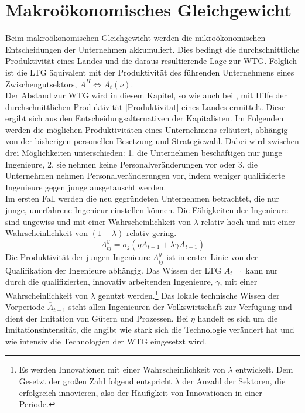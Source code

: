 \section[Makroökonomisches Gleichgewicht]{Makroökonomisches Gleichgewicht}\label{sec:makro GG}
Beim makroökonomischen Gleichgewicht werden die mikroökonomischen Entscheidungen der Unternehmen akkumuliert. Dies bedingt die durchschnittliche Produktivität eines Landes und die daraus resultierende Lage zur WTG. Folglich ist die LTG äquivalent mit der Produktivität des führenden Unternehmens eines Zwischengutsektors, $A^H \Leftrightarrow A_t(\nu)$.\\
%
Der Abstand zur WTG wird in diesem Kapitel, so wie auch bei \cite{Acemoglu.2006}, mit Hilfe der durchschnittlichen Produktivität \eqref{Produktivitat} eines Landes ermittelt.
Diese ergibt sich aus den Entscheidungsalternativen der Kapitalisten. Im Folgenden werden die möglichen Produktivitäten eines Unternehmens erläutert, abhängig von der bisherigen personellen Besetzung und Strategiewahl. Dabei wird zwischen drei Möglichkeiten unterschieden: 1. die Unternehmen beschäftigen nur junge Ingenieure, 2. sie nehmen keine Personalveränderungen vor oder 3. die Unternehmen nehmen Personalveränderungen vor, indem weniger qualifizierte Ingenieure gegen junge ausgetauscht werden.\\
%
Im ersten Fall werden die neu gegründeten Unternehmen betrachtet, die nur junge, unerfahrene Ingenieur einstellen können. Die Fähigkeiten der Ingenieure sind ungewiss und mit einer Wahrscheinlichkeit von $\lambda$ relativ hoch und mit einer Wahrscheinlichkeit von $(1-\lambda)$ relativ gering.
%
	\begin{equation}
		A_{tj}^{y}=\sigma_j(\eta\overline{A}_{t-1}+\lambda\gamma A_{t-1})\label{Produktivitat jung}
	\end{equation}
%
Die Produktivität der jungen Ingenieure $A_{tj}^{y}$ ist in erster Linie von der Qualifikation der Ingenieure abhängig. Das Wissen der LTG $A_{t-1}$ kann nur durch die qualifizierten, innovativ arbeitenden Ingenieure, $\gamma$, mit einer Wahrscheinlichkeit von $\lambda$ genutzt werden.\footnote{Es werden Innovationen mit einer Wahrscheinlichkeit von $\lambda$ entwickelt. Dem Gesetzt der großen Zahl folgend entspricht $\lambda$ der Anzahl der Sektoren, die erfolgreich innovieren, also der Häufigkeit von Innovationen in einer Periode.} Das lokale technische Wissen der Vorperiode $\overline{A}_{t-1}$ steht allen Ingenieuren der Volkswirtschaft zur Verfügung und dient der Imitation von Gütern und Prozessen. Bei $\eta$ handelt es sich um die Imitationsintensität, die angibt wie stark sich die Technologie verändert hat und wie intensiv die Technologien der WTG eingesetzt wird.\\
